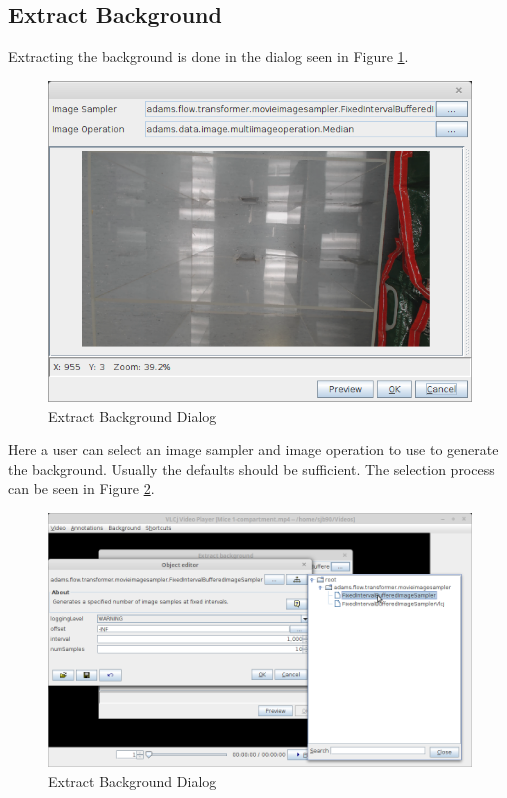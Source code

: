 \documentclass[a4paper]{book}
\begin{document}
\subsection{Extract Background}
Extracting the background is done in the dialog seen in Figure \ref{AnnotatorExtractBackground}.

\begin{figure}[htb]
  \centering
  \includegraphics[width=12.0cm]{images/AnnotatorExtractBackground.png}
  \caption{Extract Background Dialog}
  \label{AnnotatorExtractBackground}
\end{figure}

Here a user can select an image sampler and image operation to use to generate the background. Usually the defaults
should be sufficient. The selection process can be seen in Figure \ref{AnnotatorSamplerSelection}.

\begin{figure}[htb]
  \centering
  \includegraphics[width=12.0cm]{images/AnnotatorBackgroundExtractionSamplerSelection.png}
  \caption{Extract Background Dialog}
  \label{AnnotatorSamplerSelection}
\end{figure}
\end{document}
